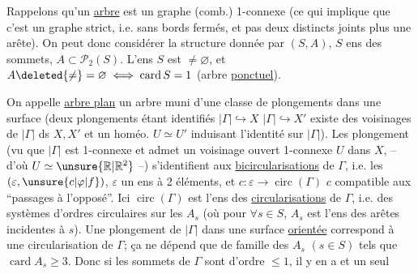 Rappelons qu'un \uline{arbre} est un graphe (comb.)
1-connexe (ce qui implique que c'est un graphe
strict, i.e. sans bords fermés, et pas deux 
distincts joints  plus une arête). On peut donc
considérer la structure donnée par $(S,A)$,
$S$ ens des sommets, $A\subset\mathcal P_2(S)$.  L'ens $S$ est $\ne\varnothing$,
et $A\deleted{\ne}=\varnothing\iff\operatorname{card}S=1$ (arbre \uline{ponctuel}).

On appelle \uline{arbre plan} un arbre muni d'une
classe de plongements dans une surface
(deux plongements étant identifiés $|\Gamma|\hookrightarrow X$
$|\Gamma|\hookrightarrow X'$  existe des voisinages de $|\Gamma|$ ds $X,X'$
et un homéo. $U\simeq U'$ induisant l'identité sur $|\Gamma|$).
Les  plongement (vu que $|\Gamma|$ est 1-connexe et
admet un voisinage ouvert 1-connexe $U$ dans $X$,
-- d'où $U\simeq\unsure{\mathbb R|\mathbb R^2}$ --) s'identifient aux \uline{bicircularisations}
de $\Gamma$, i.e. les   $(\varepsilon,\unsure{c|\varphi|f})$, $\varepsilon$ un
ens à 2 éléments,  et $c:\varepsilon\longrightarrow\operatorname{circ}(\Gamma)$
$c$ compatible aux ``passages à l'opposé''. Ici $\operatorname{circ}(\Gamma)$
est l'ens des \uline{circularisations} de $\Gamma$, i.e.
des systèmes d'ordres circulaires sur les
$A_s$ (où pour $\forall s\in S$, $A_s$ est l'ens des arêtes incidentes
à $s$). Une  plongement de $|\Gamma|$ dans une surface
\uline{orientée} correspond à une circularisation de
$\Gamma$; ça ne dépend que de  famille des
$A_s$ $(s\in S)$ tels que $\operatorname{card}A_s\geq3$. Donc si les sommets
de $\Gamma$ sont d'ordre $\leq1$, il y en a  et un seul

